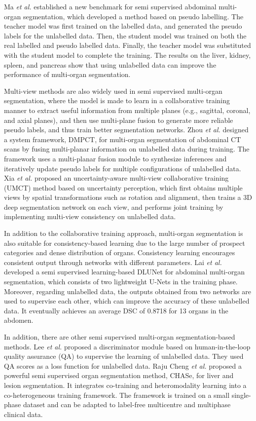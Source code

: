 \documentclass[lettersize,journal]{IEEEtran}
\begin{document}
Ma {\it{et al.}} \cite{36} established a new benchmark for semi supervised abdominal multi-organ segmentation, which developed a method based on pseudo labelling. The teacher model was first trained on the labelled data, and generated the pseudo labels for the unlabelled data. Then, the student model was trained on both the real labelled and pseudo labelled data. Finally, the teacher model was substituted with the student model to complete the training. The results on the liver, kidney, spleen, and pancreas show that using unlabelled data can improve the performance of multi-organ segmentation.

Multi-view methods are also widely used in semi supervised multi-organ segmentation, where the model is made to learn in a collaborative training manner to extract useful information from multiple planes (e.g., sagittal, coronal, and axial planes), and then use multi-plane fusion to generate more reliable pseudo labels, and thus train better segmentation networks. Zhou {\it{et al.}} \cite{207} designed a system framework, DMPCT, for multi-organ segmentation of abdominal CT scans by fusing multi-planar information on unlabelled data during training. The framework uses a multi-planar fusion module to synthesize inferences and iteratively update pseudo labels for multiple configurations of unlabelled data. Xia {\it{et al.}} \cite{208} proposed an uncertainty-aware multi-view collaborative training (UMCT) method based on uncertainty perception, which first obtains multiple views by spatial transformations such as rotation and alignment, then trains a 3D deep segmentation network on each view, and performs joint training by implementing multi-view consistency on unlabelled data.

In addition to the collaborative training approach, multi-organ segmentation is also suitable for consistency-based learning due to the large number of prospect categories and dense distribution of organs. Consistency learning encourages consistent output through networks with different parameters. Lai {\it{et al.}} \cite{209} developed a semi supervised learning-based DLUNet for abdominal multi-organ segmentation, which consists of two lightweight U-Nets in the training phase. Moreover, regarding unlabelled data, the outputs obtained from two networks are used to supervise each other, which can improve the accuracy of these unlabelled data. It eventually achieves an average DSC of 0.8718 for 13 organs in the abdomen.

In addition, there are other semi supervised multi-organ segmentation-based methods. Lee {\it{et al.}} \cite{210} proposed a discriminator module based on human-in-the-loop quality assurance (QA) to supervise the learning of unlabelled data. They used QA scores as a loss function for unlabelled data. Raju Cheng {\it{et al.}} \cite{211} proposed a powerful semi supervised organ segmentation method, CHASe, for liver and lesion segmentation. It integrates co-training and heteromodality learning into a co-heterogeneous training framework. The framework is trained on a small single-phase dataset and can be adapted to label-free multicentre and multiphase clinical data.
\end{document}
